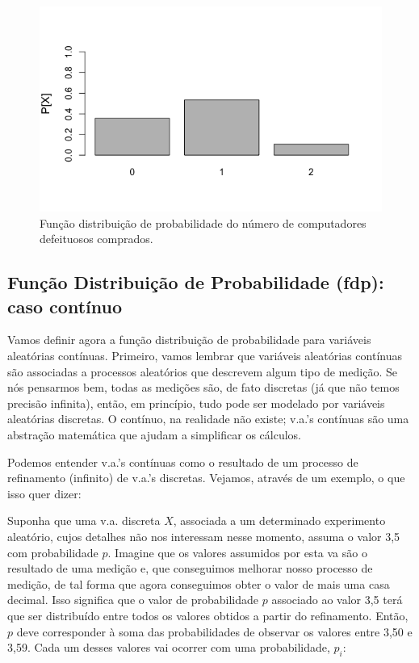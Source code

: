 \documentclass[
]{book}
\theoremstyle{definition}
\theoremstyle{definition}
\theoremstyle{definition}
\theoremstyle{remark}
\begin{document}
\begin{figure}
\includegraphics[width=0.6\linewidth]{img/comp} \caption{Função distribuição de probabilidade do número de computadores defeituosos comprados.}\label{fig:ch5-comp}
\end{figure}

\hypertarget{funuxe7uxe3o-distribuiuxe7uxe3o-de-probabilidade-fdp-caso-contuxednuo}{%
\subsection*{Função Distribuição de Probabilidade (fdp): caso contínuo}\label{funuxe7uxe3o-distribuiuxe7uxe3o-de-probabilidade-fdp-caso-contuxednuo}}

Vamos definir agora a função distribuição de probabilidade para variáveis aleatórias contínuas.
Primeiro, vamos lembrar que variáveis aleatórias contínuas são associadas a processos aleatórios que descrevem algum tipo de medição. Se nós pensarmos bem, todas as medições são, de fato discretas (já que não temos precisão infinita), então, em princípio, tudo pode ser modelado por variáveis aleatórias discretas. O contínuo, na realidade não existe; v.a.'s contínuas são uma abstração matemática que ajudam a simplificar os cálculos.

Podemos entender v.a.'s contínuas como o resultado de um processo de refinamento (infinito) de v.a.'s discretas. Vejamos, através de um exemplo, o que isso quer dizer:

Suponha que uma v.a. discreta \(X\), associada a um determinado experimento aleatório, cujos detalhes não nos interessam nesse momento, assuma o valor 3,5 com probabilidade \(p\). Imagine que os valores assumidos por esta va são o resultado de uma medição e, que conseguimos melhorar nosso processo de medição, de tal forma que agora conseguimos obter o valor de mais uma casa decimal. Isso significa que o valor de probabilidade \(p\) associado ao valor 3,5 terá que ser distribuído entre todos os valores obtidos a partir do refinamento. Então, \(p\) deve corresponder à soma das probabilidades de observar os valores entre 3,50 e 3,59. Cada um desses valores vai ocorrer com uma probabilidade, \(p_i\):
\end{document}
